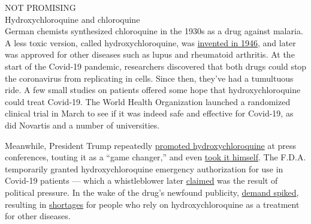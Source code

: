 NOT PROMISING\\
Hydroxychloroquine and chloroquine\\
German chemists synthesized chloroquine in the 1930s as a drug against
malaria. A less toxic version, called hydroxychloroquine, was
\href{https://www.nature.com/articles/s41421-020-0156-0\#:~:text=Hydroxychloroquine\%20(HCQ)\%20sulfate\%2C\%20a,than\%20CQ\%20in\%20animals4.}{invented
in 1946}, and later was approved for other diseases such as lupus and
rheumatoid arthritis. At the start of the Covid-19 pandemic, researchers
discovered that both drugs could stop the coronavirus from replicating
in cells. Since then, they've had a tumultuous ride. A few small studies
on patients offered some hope that hydroxychloroquine could treat
Covid-19. The World Health Organization launched a randomized clinical
trial in March to see if it was indeed safe and effective for Covid-19,
as did Novartis and a number of universities.

Meanwhile, President Trump repeatedly
\href{https://www.nytimes3xbfgragh.onion/2020/04/06/us/politics/coronavirus-trump-malaria-drug.html}{promoted
hydroxychloroquine} at press conferences, touting it as a ``game
changer,'' and even
\href{https://www.nytimes3xbfgragh.onion/2020/05/18/us/politics/trump-hydroxychloroquine-covid-coronavirus.html}{took
it himself}. The F.D.A. temporarily granted hydroxychloroquine emergency
authorization for use in Covid-19 patients --- which a whistleblower
later
\href{https://www.buzzfeednews.com/article/zahrahirji/fda-eua-hydroxychloroquine-chloroquine}{claimed}
was the result of political pressure. In the wake of the drug's newfound
publicity,
\href{https://www.nytimes3xbfgragh.onion/2020/04/25/us/coronavirus-trump-chloroquine-hydroxychloroquine.html}{demand
spiked}, resulting in
\href{https://ard.bmj.com/content/early/2020/07/01/annrheumdis-2020-218164}{shortages}
for people who rely on hydroxychloroquine as a treatment for other
diseases.

